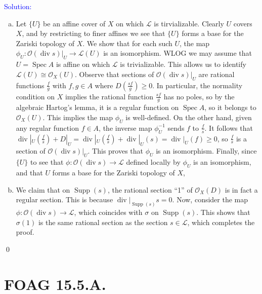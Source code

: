\documentclass[11pt]{article}
\newcommand{\cL}{\mathcal{L}}
\newcommand{\cO}{\mathcal{O}}
\DeclareMathOperator{\Spec}{\operatorname{Spec}}
\newcommand{\Supp}{\operatorname{Supp}}
\newcommand{\Div}{\operatorname{div}}
\newenvironment{solution}{\begin{trivlist}\item[]{\textcolor{blue}{Solution:}}}{\qed \end{trivlist}}
\begin{document}
\begin{solution}
\begin{enumerate}[(a)]
    \item Let $\{U\}$ be an affine cover of $X$ on which $\cL$ is tirvializable. Clearly $U$ covers $X$, and by restricting to finer affines we see that $\{U\}$ forms a base for the Zariski topology of $X$. We show that for each such $U$, the map $\phi_U: \cO(\Div s)|_U \rightarrow \cL(U)$ is an isomorphism. WLOG we may assume that $U = \Spec A$ is affine on which $\cL$ is trivializable. This allows us to identify $\cL(U) \cong \cO_X(U)$. Observe that sections of $\cO(\Div s)|_U$ are rational functions $\frac{f}{g}$ with $f,g \in A$ where $D(\frac{sf}{g}) \geq 0$. In particular, the normality condition on $X$ implies the rational function $\frac{sf}{g}$ has no poles, so by the algebraic Hartog's lemma, it is a regular function on $\Spec A$, so it belongs to $\cO_X(U)$. This implies the map $\phi_U$ is well-defined. On the other hand, given any regular function $f \in A$, the inverse map $\phi_U^{-1}$ sends $f$ to $\frac{f}{s}$. It follows that $\Div|_U (\frac{f}{s}) + D|_U = \Div|_U (\frac{f}{s}) + \Div|_U(s) = \Div|_U(f) \geq 0$, so $\frac{f}{s}$ is a section of $\cO(\Div s)|_U$. This proves that $\phi_U$ is an isomorphism. 
    Finally, since $\{U\}$ to see that $\phi: \cO(\Div s) \rightarrow \cL$ defined locally by $\phi_U$ is an isomorphism, and that $U$ forms a base for the Zariski topology of $X$, 

    \item We claim that on $\Supp(s)$, the rational section ``1'' of $\cO_X(D)$ is in fact a regular section. This is because $\Div|_{\Supp(s)} s = 0$. Now, consider the map $\phi: \cO(\Div s) \rightarrow \cL$, which coincides with $\sigma$ on $\Supp(s)$. This shows that $\sigma(1)$ is the same rational section as the section $s \in \cL$, which completes the proof. 
\end{enumerate}
\end{solution}

\newpage

\section*{FOAG 15.5.A.}
\end{document}
